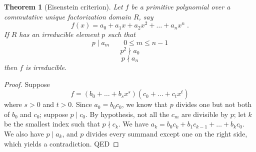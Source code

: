 \documentclass{article}
\begin{document}

\newtheorem*{thm}{Theorem}
\begin{thm}[Eisenstein criterion]
Let $f$ be a primitive polynomial over a commutative unique factorization domain $R$, say
$$f(x)=a_0 + a_1x + a_2x^2 + \ldots + a_nx^n \;.$$
If $R$ has an irreducible element $p$ such that
$$p\mid a_m \qquad 0\le m\le n-1$$
$$p^2 \nmid a_0$$
$$p \nmid a_n$$
then $f$ is irreducible.
\end{thm}

\begin{proof}
Suppose
$$f=(b_0 + \ldots + b_s x^s)(c_0 + \ldots + c_t x^t)$$
where $s>0$ and $t>0$. Since $a_0 = b_0 c_0$, we know that $p$ divides one but not both of $b_0$ and $c_0$; suppose $p \mid c_0$. By hypothesis, not all the $c_m$ are divisible by $p$; let $k$ be the smallest index such that $p\nmid c_k$. We have $a_k = b_0 c_k + b_1 c_{k-1} + \ldots + b_k c_0$.
We also have $p\mid a_k$, and $p$ divides every summand except one on the right side, which yields a contradiction. QED
\end{proof}
\end{document}
